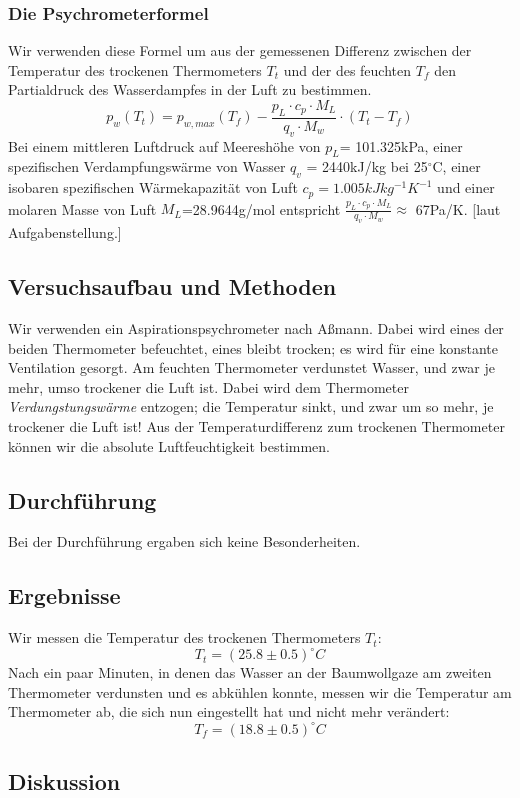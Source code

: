 \documentclass{article}
\begin{document}
\subsubsection*{Die Psychrometerformel}
Wir verwenden diese Formel um aus der gemessenen Differenz zwischen der Temperatur des trockenen Thermometers $T_t$ und der des feuchten $T_f$ den Partialdruck des Wasserdampfes in der Luft zu bestimmen.
\begin{equation}
\label{psychrometerformel}
p_w(T_t)=p_{w,max}(T_f)-\frac{p_L\cdot c_p \cdot M_L}{q_v\cdot M_w} \cdot (T_t - T_f)
\end{equation}
Bei einem mittleren Luftdruck auf Meereshöhe von $p_L$= 101.325kPa, einer spezifischen Verdampfungswärme von Wasser $q_v$ = 2440kJ/kg bei 25$^\circ$C, einer isobaren spezifischen Wärmekapazität von Luft $c_p=1.005kJkg^{-1}K^{-1}$ und einer molaren Masse von Luft $M_L$=28.9644g/mol entspricht $\frac{p_L\cdot c_p \cdot M_L}{q_v\cdot M_w} \approx $ 67Pa/K. [laut Aufgabenstellung.]
\subsection{Versuchsaufbau und Methoden}
Wir verwenden ein Aspirationspsychrometer nach Aßmann. Dabei wird eines der beiden Thermometer befeuchtet, eines bleibt trocken; es wird für eine konstante Ventilation gesorgt. Am feuchten Thermometer verdunstet Wasser, und zwar je mehr, umso trockener die Luft ist. Dabei wird dem Thermometer \textit{Verdungstungswärme} entzogen; die Temperatur sinkt, und zwar um so mehr, je trockener die Luft ist! Aus der Temperaturdifferenz zum trockenen Thermometer können wir die absolute Luftfeuchtigkeit bestimmen. 
\subsection{Durchführung}
Bei der Durchführung ergaben sich keine Besonderheiten. 
\subsection{Ergebnisse}
Wir messen die Temperatur des trockenen Thermometers $T_t$:
$$T_t=(25.8 \pm 0.5) ^\circ C$$
Nach ein paar Minuten, in denen das Wasser an der Baumwollgaze am zweiten Thermometer verdunsten und es abkühlen konnte, messen wir die Temperatur am Thermometer ab, die sich nun eingestellt hat und nicht mehr verändert:
$$T_f=(18.8 \pm 0.5) ^\circ C $$ 
\subsection{Diskussion}
\end{document}
